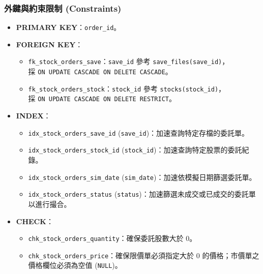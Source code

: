 \documentclass[UTF8, a4paper, 12pt, fontset=none]{ctexart}
\begin{document}
    \subsubsection*{外鍵與約束限制 (Constraints)}
    \begin{itemize}
        \item \textbf{PRIMARY KEY}：\texttt{order\_id}。
        \item \textbf{FOREIGN KEY}：
            \begin{itemize}
                \item \texttt{fk\_stock\_orders\_save}：\texttt{save\_id} 參考 \texttt{save\_files(save\_id)}，\\採 \texttt{ON UPDATE CASCADE ON DELETE CASCADE}。
                \item \texttt{fk\_stock\_orders\_stock}：\texttt{stock\_id} 參考 \texttt{stocks(stock\_id)}，\\採 \texttt{ON UPDATE CASCADE ON DELETE RESTRICT}。
            \end{itemize}
        \item \textbf{INDEX}：
            \begin{itemize}
                \item \texttt{idx\_stock\_orders\_save\_id} (\texttt{save\_id})：加速查詢特定存檔的委託單。
                \item \texttt{idx\_stock\_orders\_stock\_id} (\texttt{stock\_id})：加速查詢特定股票的委託紀錄。
                \item \texttt{idx\_stock\_orders\_sim\_date} (\texttt{sim\_date})：加速依模擬日期篩選委託單。
                \item \texttt{idx\_stock\_orders\_status} (\texttt{status})：加速篩選未成交或已成交的委託單以進行撮合。
            \end{itemize}
        \item \textbf{CHECK}：
            \begin{itemize}
                \item \texttt{chk\_stock\_orders\_quantity}：確保委託股數大於 0。
                \item \texttt{chk\_stock\_orders\_price}：確保限價單必須指定大於 0 的價格；市價單之價格欄位必須為空值 (\texttt{NULL})。
            \end{itemize}
    \end{itemize}
\end{document}
